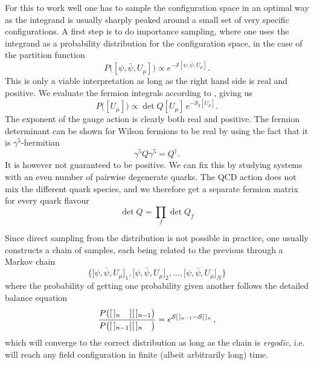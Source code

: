 For this to work well one has to sample the configuration space in an
optimal way as the integrand is usually sharply peaked around a small set of
very specific configurations. A first step is to do importance sampling, where
one uses the integrand as a probability distribution for the configuration
space, in the case of the partition function
%
\begin{equation}
  P\big([\psi,\bar{\psi}, U_{\mu}]\big) \propto e^{-\mathcal{S}[\psi,\bar{\psi}, U_{\mu}]}.
\end{equation}
%
This is only a viable interpretation as long as the right hand side is real and
positive. We evaluate the fermion integrals according to
, giving us
%
\begin{equation}
  P\big([U_{\mu}]\big) \propto \det Q[U_{\mu}] \, e^{-\mathcal{S}_g[U_{\mu}]}.
\end{equation}
%
The exponent of the gauge action is clearly both real and positive. The fermion
determinant can be shown for Wilson fermions to be real by using the fact that
it is $\gamma^5$-hermitian
%
\begin{equation}
  \gamma^5 Q \gamma^5 = Q^{\dagger}.
\end{equation}
%
It is however not guaranteed to be positive. We can fix this by studying systems
with an even number of pairwise degenerate quarks. The QCD action does not mix
the different quark species, and we therefore get a separate fermion matrix for
every quark flavour
%
\begin{equation}
  \det Q = \prod_f \det Q_f
\end{equation}

Since direct sampling from the distribution is not possible in practice,
one usually constructs a chain of samples, each being related to the previous
through a Markov chain
%
\begin{equation}
  \Big\{
    \big[\psi, \bar{\psi}, U_{\mu}\big]_1, 
    \big[\psi, \bar{\psi}, U_{\mu}\big]_2, ..., 
    \big[\psi, \bar{\psi}, U_{\mu}\big]_N
  \Big\}
\end{equation}
%
where the probability of getting one probability given another follows the
detailed balance equation
%
\begin{equation}
  \frac{%
    P\big([\,]_{n\hphantom{-1}} \big| [\,]_{n-1}\big)
  }{%
    P\big([\,]_{n-1} \big| [\,]_{n\hphantom{-1}}\big)
  } = e^{\mathcal{S}[\,]_{n-1} - \mathcal{S}[\,]_n} \,,
\end{equation}
%
which will converge to the correct distribution as long as the chain is
\emph{ergodic}, i.e. will reach any field configuration in finite (albeit
arbitrarily long) time.


